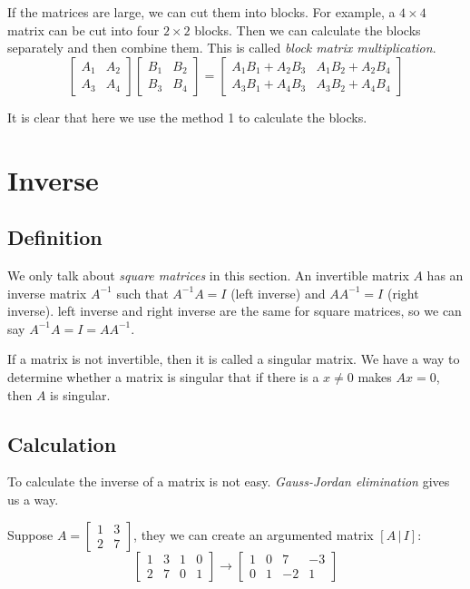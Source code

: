 \documentclass[10pt,a4paper,oneside,numbers=noenddot]{scrbook}
\theoremstyle{ctplain}
\theoremstyle{ctresult}
\begin{document}
If the matrices are large, we can cut them into blocks. For example, a $4 \times 4$
matrix can be cut into four $2 \times 2$ blocks. Then we can calculate the blocks
separately and then combine them. This is called \emph{block matrix multiplication}.
\[
  \begin{bmatrix}
    A_{1} & A_{2} \\
    A_{3} & A_{4}
  \end{bmatrix}
  \begin{bmatrix}
    B_{1} & B_{2} \\
    B_{3} & B_{4}
  \end{bmatrix}
  =
  \begin{bmatrix}
    A_{1}B_{1} + A_{2}B_{3} & A_{1}B_{2} + A_{2}B_{4} \\
    A_{3}B_{1} + A_{4}B_{3} & A_{3}B_{2} + A_{4}B_{4}
  \end{bmatrix}
\]

It is clear that here we use the method 1 to calculate the blocks.

\section{Inverse}
\subsection{Definition}

We only talk about \emph{square matrices} in this section. An invertible matrix $A$
has an inverse matrix $A^{-1}$ such that $A^{-1}A = I$ (left inverse) and $AA^{-1} = I$
(right inverse). left inverse and right inverse are the same for square matrices, so we
can say $A^{-1}A = I = AA^{-1}$.

If a matrix is not invertible, then it is called a singular matrix. We have a way to
determine whether a matrix is singular that if there is a $x \neq 0$ makes $Ax = 0$,
then $A$ is singular.

\subsection{Calculation}

To calculate the inverse of a matrix is not easy. \emph{Gauss-Jordan elimination}
gives us a way.

Suppose $A = \begin{bmatrix} 1 & 3 \\ 2 & 7 \end{bmatrix}$, they we can create an
argumented matrix $[A\,|\,I]$:
\[
  \left[
  \begin{array}{cc|cc}
    1 & 3 & 1 & 0 \\
    2 & 7 & 0 & 1
  \end{array}
  \right]
  \rightarrow
  \left[
  \begin{array}{cc|cc}
    1 & 0 & 7 & -3 \\
    0 & 1 & -2 & 1
  \end{array}
  \right]
\]
\end{document}
